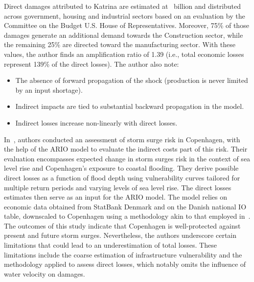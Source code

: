 Direct damages attributed to Katrina are estimated at~ billion and
distributed across government, housing and industrial sectors based on an
evaluation by the Committee on the Budget U.S. House of Representatives.
Moreover, 75\% of those damages generate an additional demand towards the
Construction sector, while the remaining 25\% are directed toward the
manufacturing sector. With these values, the author
finds an amplification ratio of 1.39 (i.e., total economic losses represent
139\% of the direct losses). The author also note:
\begin{itemize}
\item The absence of forward propagation of the shock (production is never limited
by an input shortage).
\item Indirect impacts are tied to substantial backward propagation in the model.
\item Indirect losses increase non-linearly with direct losses.
\end{itemize}

In~\textcite{hallegatte-2010-asses-climat}, authors conducted an
assessment of storm surge risk in Copenhagen, with the help of the ARIO model to
evaluate the indirect costs part of this risk. Their evaluation encompasses expected change in storm
surges risk in the context of sea level rise and Copenhagen's exposure to coastal
flooding. They derive possible direct losses as a function of flood
depth using vulnerability curves tailored for multiple return periods and varying levels of sea
level rise. The direct losses estimates then serve as an input for the ARIO
model. The model relies on economic data obtained from StatBank Denmark and on the Danish
national IO table, downscaled to Copenhagen using a methodology akin to that
employed in~\textcite{hallegatte-2008-adapt-region}. The outcomes of
this study indicate that Copenhagen is well-protected against present and future
storm surges. Nevertheless, the authors underscore certain limitations that
could lead to an underestimation of total losses. These limitations
include the coarse estimation of infrastructure vulnerability and the
methodology applied to assess direct losses, which notably omits the influence
of water velocity on damages.

